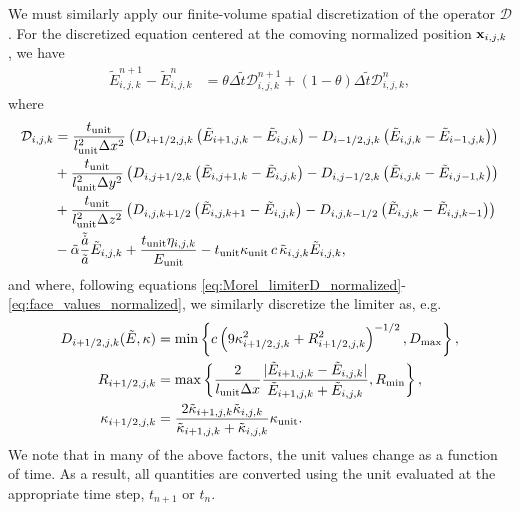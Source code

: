 \documentclass[10pt]{article}
\renewcommand{\(}{\left(}
\renewcommand{\)}{\right)}
\newcommand{\xvec}{{\bf x}}
\newcommand{\adot}{\dot{a}}
\newcommand{\mD}{{\mathcal D}}
\newcommand{\Lunit}{l_{\text{unit}}}
\newcommand{\Tunit}{t_{\text{unit}}}
\newcommand{\Eunit}{E_{\text{unit}}}
\newcommand{\Kunit}{\kappa_{\text{unit}}}
\newcommand{\tK}{\tilde{\kappa}}
\newcommand{\tT}{\tilde{t}}
\newcommand{\tE}{\tilde{E}}
\newcommand{\tA}{\tilde{a}}
\newcommand{\tAdot}{\tilde{\adot}}
\newcommand{\talpha}{\tilde{\alpha}}
\begin{document}
We must similarly apply our finite-volume spatial discretization of
the operator $\mD$.  For the discretized equation centered at the
comoving normalized position $\xvec_{i,j,k}$, we have 
\begin{align}
  \label{eq:mgfld_discrete}
  \tE_{i,j,k}^{n+1} - \tE_{i,j,k}^n &= \theta\Delta \tT \mD_{i,j,k}^{n+1} 
    + (1-\theta)\Delta \tT \mD_{i,j,k}^{n},
\end{align}
where
\begin{align}
  \label{eq:discrete_operator}
  \mD_{i,j,k} &= 
       \frac{\Tunit}{\Lunit^2 \Delta x^2}\(D_{i+1/2,j,k}\(\tE_{i+1,j,k} - \tE_{i,j,k}\) - D_{i-1/2,j,k}\(\tE_{i,j,k} - \tE_{i-1,j,k}\)\) \\
 \notag
    &+ \frac{\Tunit}{\Lunit^2 \Delta y^2}\(D_{i,j+1/2,k}\(\tE_{i,j+1,k} - \tE_{i,j,k}\) - D_{i,j-1/2,k}\(\tE_{i,j,k} - \tE_{i,j-1,k}\)\) \\
  \notag
    &+ \frac{\Tunit}{\Lunit^2 \Delta z^2}\(D_{i,j,k+1/2}\(\tE_{i,j,k+1} - \tE_{i,j,k}\) - D_{i,j,k-1/2}\(\tE_{i,j,k} - \tE_{i,j,k-1}\)\) \\
  \notag
    &- \talpha\frac{\tAdot}{\tA} \tE_{i,j,k} + \frac{\Tunit \eta_{i,j,k}}{\Eunit} 
     - \Tunit \Kunit\, c\, \tK_{i,j,k} \tE_{i,j,k},
\end{align}
and where, following equations
\eqref{eq:Morel_limiterD_normalized}-\eqref{eq:face_values_normalized},
we similarly discretize the limiter as, e.g.
\begin{align}
  \label{eq:discrete_limiter}
  D_{i+1/2,j,k}(\tE,\kappa) &= \min\left\{ c \left(9\kappa_{i+1/2,j,k}^2 + R_{i+1/2,j,k}^2\right)^{-1/2},
    D_\text{max} \right\},\\
  \notag
  R_{i+1/2,j,k} &= \max\left\{\frac{2}{\Lunit \Delta x} \frac{|\tE_{i+1,j,k}-\tE_{i,j,k}|}{\tE_{i+1,j,k}+\tE_{i,j,k}}, R_\text{min} \right\}, \\
  \notag
  \kappa_{i+1/2,j,k} &= \frac{2 \tK_{i+1,j,k} \tK_{i,j,k}}{\tK_{i+1,j,k} + \tK_{i,j,k}}\Kunit.
\end{align}
We note that in many of the above factors, the unit values change
as a function of time.  As a result, all quantities are converted
using the unit evaluated at the appropriate time step, $t_{n+1}$ or
$t_n$.






\end{document}
